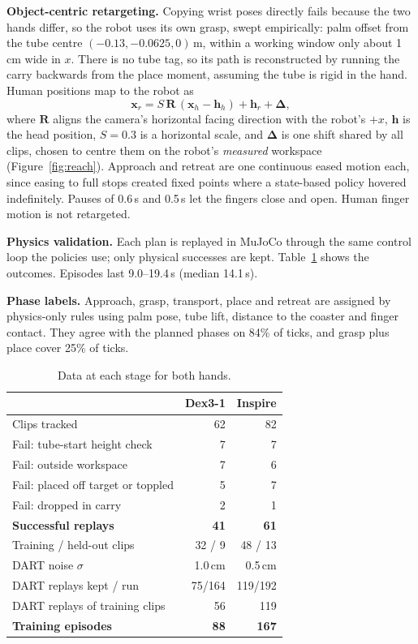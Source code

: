 \documentclass[10pt,twocolumn]{article}
\begin{document}
\textbf{Object-centric retargeting.} Copying wrist poses directly fails because the two hands differ, so the robot
uses its own grasp, swept empirically: palm offset from the tube centre $(-0.13, -0.0625, 0)$\,m, within a working
window only about 1\,cm wide in $x$. There is no tube tag, so its path is reconstructed by running the carry backwards
from the place moment, assuming the tube is rigid in the hand. Human positions map to the robot as
\begin{equation}
\mathbf{x}_r = S\,\mathbf{R}\,(\mathbf{x}_h - \mathbf{h}_h) + \mathbf{h}_r + \boldsymbol{\Delta},
\end{equation}
where $\mathbf{R}$ aligns the camera's horizontal facing direction with the robot's $+x$, $\mathbf{h}$ is the head
position, $S=0.3$ is a horizontal scale, and $\boldsymbol{\Delta}$ is one shift shared by all clips, chosen to centre
them on the robot's \emph{measured} workspace (Figure~\ref{fig:reach}). Approach and retreat are one continuous eased
motion each, since easing to full stops created fixed points where a state-based policy hovered indefinitely. Pauses
of 0.6\,s and 0.5\,s let the fingers close and open. Human finger motion is not retargeted.

\textbf{Physics validation.} Each plan is replayed in MuJoCo through the same control loop the policies use; only
physical successes are kept. Table~\ref{tab:data} shows the outcomes. Episodes last 9.0--19.4\,s (median 14.1\,s).

\textbf{Phase labels.} Approach, grasp, transport, place and retreat are assigned by physics-only rules using palm
pose, tube lift, distance to the coaster and finger contact. They agree with the planned phases on 84\% of ticks, and
grasp plus place cover 25\% of ticks.

\begin{table}[t]
\centering\small
\caption{Data at each stage for both hands.}
\label{tab:data}
\begin{tabular}{@{}lrr@{}}
\toprule
 & Dex3-1 & Inspire \\
\midrule
Clips tracked & 62 & 82 \\
Fail: tube-start height check & 7 & 7 \\
Fail: outside workspace & 7 & 6 \\
Fail: placed off target or toppled & 5 & 7 \\
Fail: dropped in carry & 2 & 1 \\
\textbf{Successful replays} & \textbf{41} & \textbf{61} \\
Training / held-out clips & 32 / 9 & 48 / 13 \\
DART noise $\sigma$ & 1.0\,cm & 0.5\,cm \\
DART replays kept / run & 75/164 & 119/192 \\
DART replays of training clips & 56 & 119 \\
\textbf{Training episodes} & \textbf{88} & \textbf{167} \\
\bottomrule
\end{tabular}
\end{table}
\end{document}
